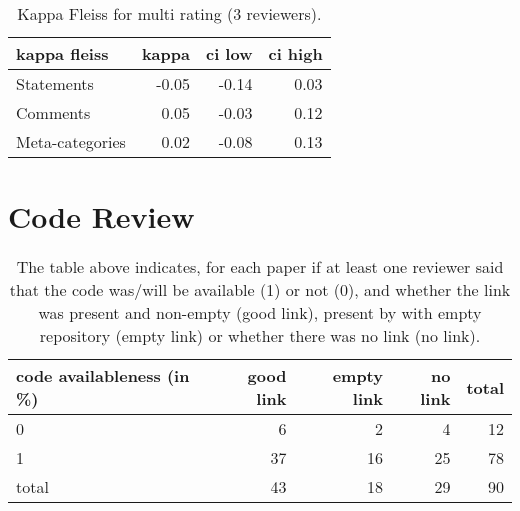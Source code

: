 \documentclass{article}
\begin{document}
\begin{table}[H]

\centering

\begin{tabular}{lrrr}
\hline
 kappa fleiss    &   kappa &   ci low &   ci high \\
\hline
 Statements      &   -0.05 &    -0.14 &      0.03 \\
 Comments        &    0.05 &    -0.03 &      0.12 \\
 Meta-categories &    0.02 &    -0.08 &      0.13 \\
\hline
\end{tabular}\caption{Kappa Fleiss for multi rating (3 reviewers).}

\end{table}



\section{Code Review} 

\begin{table}[H]

\centering

\begin{tabular}{lrrrr}
\hline
 code availableness (in \%)   &   good link &   empty link &   no link &   total \\
\hline
 0                           &           6 &            2 &         4 &      12 \\
 1                           &          37 &           16 &        25 &      78 \\
 total                       &          43 &           18 &        29 &      90 \\
\hline
\end{tabular}\caption{The table above indicates, for each paper if at least one reviewer said that the 
 code was/will be available (1) or not (0), and whether the link was present and non-empty (good link), 
 present by with empty repository (empty link) or whether there was no link (no link).}

\end{table}
\end{document}
